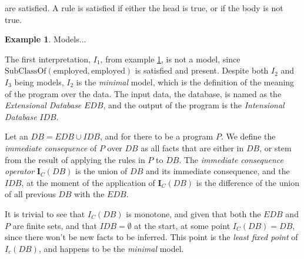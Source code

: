 \documentclass[sigconf,screen,review,natbib]{acmart}
\theoremstyle{definition}
\newtheorem{exmp}{Example}[section]
\begin{document}
are satisfied. A rule is satisfied if either the head is true, or if the body is not true.
\begin{exmp}{Models}\label{ex4}
	...
\end{exmp}
The first interpretation, $I_1$, from example \ref{ex4}, is not a model, since $\text{SubClassOf}(\text{employed}, \text{employed})$ is satisfied
and present. Despite both $I_2$ and $I_3$ being models, $I_2$ is the \textit{minimal} model, which is the definition of the meaning of the program
over the data. The input data, the database, is named as the \textit{Extensional Database} $EDB$, and the output of the program is the \textit{Intensional Database}
$IDB$.

Let an $DB = EDB \cup IDB$, and for there to be a program $P$. We define the \textit{immediate consequence} of $P$ over $DB$ as all facts
that are either in $DB$, or stem from the result of applying the rules in $P$ to $DB$. The \textit{immediate consequence operator}
$\textbf{I}_C(DB)$ is the union of $DB$ and its immediate consequence, and the $IDB$, at the moment of the application of $\textbf{I}_C(DB)$
is the difference of the union of all previous $DB$ with the $EDB$.


It is trivial to see that $I_C(DB)$ is monotone, and given that both the $EDB$ and $P$ are finite sets, and that $IDB = \emptyset$ at the start,
at some point $I_C(DB) = DB$, since there won't be new facts to be inferred. This point is the \textit{least fixed point} of $I_c(DB)$\cite{datalog},
and happens to be the \textit{minimal} model.
\end{document}

